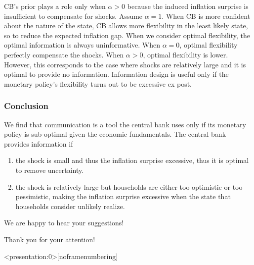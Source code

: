 \documentclass{beamer}
\begin{document}
\begin{frame}[allowframebreaks]
\begin{figure}[H]
    \end{figure}
    CB's prior plays a role only when $\alpha>0$ because the induced inflation surprise is insufficient to compensate for shocks.
    \vskip10pt
    Assume $\alpha=1$. When CB is more confident about the nature of the state, CB allows more flexibility in the least likely state, so to reduce the expected inflation gap.
    \vskip10pt
    \framebreak
    When we consider optimal flexibility, the optimal information is always uninformative.
    \vskip10pt
    When $\alpha=0$, optimal flexibility perfectly compensate the shocks.
    \vskip10pt
    When $\alpha>0$, optimal flexibility is lower. However, this corresponds to the case where shocks are relatively large and it is optimal to provide no information.
    \vskip10pt
    Information design is useful only if the monetary policy's flexibility turns out to be excessive ex post.
\end{frame}


\begin{frame}
	\frametitle{Conclusion}
    We find that communication is a tool the central bank uses only if its monetary policy is sub-optimal given the economic fundamentals.
    \vskip10pt
    The central bank provides information if
    \begin{enumerate}
        \item the shock is small and thus the inflation surprise excessive, thus it is optimal to remove uncertainty.
        \item the shock is relatively large but households are either too optimistic or too pessimistic, making the inflation surprise excessive when the state that households consider unlikely realize.
    \end{enumerate}
    \vskip10pt
    We are happy to hear your suggestions!
\end{frame}

\begin{frame}
	\begin{huge}
		\centerline{Thank you for your attention!}
	\end{huge}
\end{frame}

\begin{frame}<presentation:0>[noframenumbering]
	
	
\end{frame}
\end{document}
